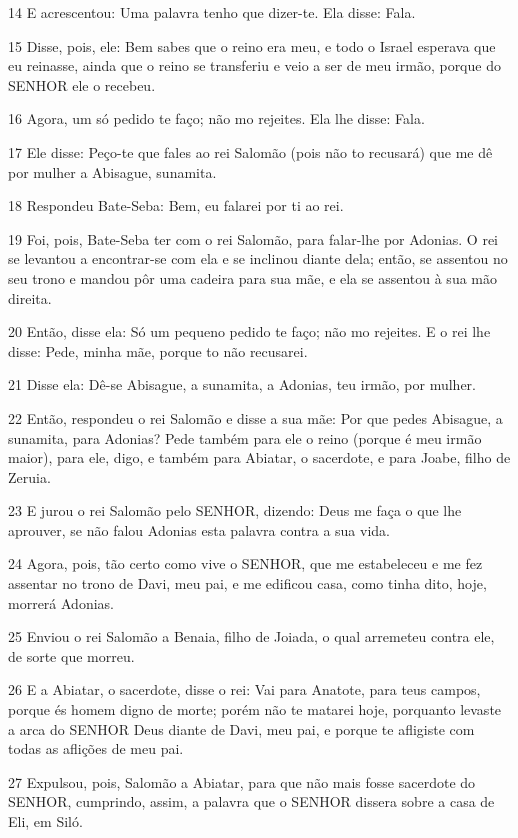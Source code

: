 \par 14 E acrescentou: Uma palavra tenho que dizer-te. Ela disse: Fala.
\par 15 Disse, pois, ele: Bem sabes que o reino era meu, e todo o Israel esperava que eu reinasse, ainda que o reino se transferiu e veio a ser de meu irmão, porque do SENHOR ele o recebeu.
\par 16 Agora, um só pedido te faço; não mo rejeites. Ela lhe disse: Fala.
\par 17 Ele disse: Peço-te que fales ao rei Salomão (pois não to recusará) que me dê por mulher a Abisague, sunamita.
\par 18 Respondeu Bate-Seba: Bem, eu falarei por ti ao rei.
\par 19 Foi, pois, Bate-Seba ter com o rei Salomão, para falar-lhe por Adonias. O rei se levantou a encontrar-se com ela e se inclinou diante dela; então, se assentou no seu trono e mandou pôr uma cadeira para sua mãe, e ela se assentou à sua mão direita.
\par 20 Então, disse ela: Só um pequeno pedido te faço; não mo rejeites. E o rei lhe disse: Pede, minha mãe, porque to não recusarei.
\par 21 Disse ela: Dê-se Abisague, a sunamita, a Adonias, teu irmão, por mulher.
\par 22 Então, respondeu o rei Salomão e disse a sua mãe: Por que pedes Abisague, a sunamita, para Adonias? Pede também para ele o reino (porque é meu irmão maior), para ele, digo, e também para Abiatar, o sacerdote, e para Joabe, filho de Zeruia.
\par 23 E jurou o rei Salomão pelo SENHOR, dizendo: Deus me faça o que lhe aprouver, se não falou Adonias esta palavra contra a sua vida.
\par 24 Agora, pois, tão certo como vive o SENHOR, que me estabeleceu e me fez assentar no trono de Davi, meu pai, e me edificou casa, como tinha dito, hoje, morrerá Adonias.
\par 25 Enviou o rei Salomão a Benaia, filho de Joiada, o qual arremeteu contra ele, de sorte que morreu.
\par 26 E a Abiatar, o sacerdote, disse o rei: Vai para Anatote, para teus campos, porque és homem digno de morte; porém não te matarei hoje, porquanto levaste a arca do SENHOR Deus diante de Davi, meu pai, e porque te afligiste com todas as aflições de meu pai.
\par 27 Expulsou, pois, Salomão a Abiatar, para que não mais fosse sacerdote do SENHOR, cumprindo, assim, a palavra que o SENHOR dissera sobre a casa de Eli, em Siló.
